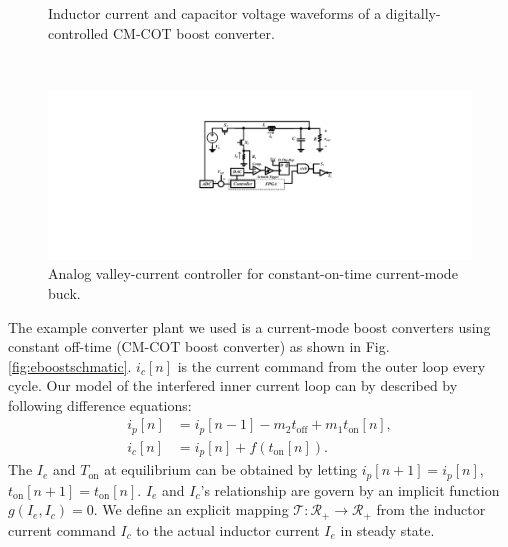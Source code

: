 \begin{figure}
\begin{minipage}{0.32\textwidth}
  \caption{\label{fig:lcwavefrom} Inductor current and capacitor voltage waveforms of a digitally-controlled CM-COT boost converter.}
\end{minipage}
~
\begin{minipage}{0.32\textwidth}
    \centering
    \includegraphics[width=\textwidth]{Figure/section2/currentdetection.pdf}
    \caption{\label{fig:currentdection} Analog valley-current controller for constant-on-time
    current-mode buck.}
\end{minipage}
\end{figure}

The example converter plant we used is a current-mode boost converters using constant off-time (CM-COT boost converter) as shown in Fig.\;\ref{fig:eboostschmatic}.
$i_c[n]$ is the current command from the outer loop every cycle. Our model of the interfered inner current loop can by described by following difference equations:
\begin{align} \label{sys:innerloop}
i_p[n] &= i_p[n-1] - m_2t_{\text{off}} +m_1t_{\text{on}}[n], \\
i_c [n] &= i_p[n] +f(t_{\text{on}}[n]).
\end{align}
The $I_e$ and $T_{\text{on}}$ at equilibrium can be obtained by letting $i_p[n+1] = i_p[n]$, $t_{\text{on}}[n+1] = t_{\text{on}}[n]$. $I_e$ and $I_c$’s relationship are govern by an implicit function $g(I_e, I_c) = 0$. We define an explicit mapping $\mathcal{T}: \mathcal{R}_+ \rightarrow \mathcal{R}_+$ from the inductor current command $I_c$ to the actual inductor current $I_e$ in steady state.

